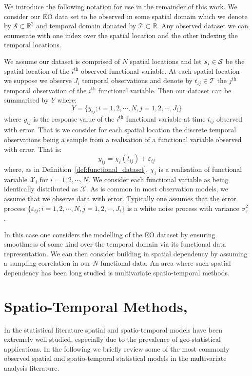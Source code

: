 We introduce the following notation for use in the remainder of this work.
We consider our EO data set to be observed in some spatial domain which we denote by $\mathcal{S} \subset \mathbb{R}^2$ and temporal domain donated by $\mathcal{T} \subset \mathbb{R}$.
Any observed dataset we can enumerate with one index over the spatial location and the other indexing the temporal locations.

We assume our dataset is comprised of $N$ spatial locations and let $\bm{{s}}_i \in \mathcal{S}$ be the spatial location of the $i^\text{th}$ observed functional variable.
At each spatial location we suppose we observe $J_i$ temporal observations and denote by $t_{ij} \in \mathcal{T}$ the $j^\text{th}$ temporal observation of the $i^\text{th}$ functional variable.
Then our dataset can be summarised by $Y$ where:
\begin{equation}
	Y = \{ y_{ij}; i=1,2,\cdots,N, j=1,2, \cdots, J_i \}
	\label{eqn:observed_data}
\end{equation}
where $y_{ij}$ is the response value of the $i^\text{th}$ functional variable at time $t_{ij}$ observed with error.
That is we consider for each spatial location the discrete temporal observations being a sample from a realisation of a functional variable observed with error.
That is:
\begin{equation}
	y_{ij} = \chi_{i}\left( t_{ij} \right) + \varepsilon_{ij}
	\label{eqn:fd_temporal}
\end{equation}
where, as in Definition~\ref{def:functional_dataset}, $\chi_i$ is a realisation of functional variable $\mathcal{X}_i$ for $i=1,2,\cdots,N$.
We consider each functional variable as being identically distributed as $\mathcal{X}$.
As is common in most observation models, we assume that we observe data with error.
Typically one assumes that the error process $\{\varepsilon_{ij}; i=1,2,\cdots,N, j=1,2,\cdots,J_i\}$ is a white noise process with variance $\sigma_\varepsilon^2$. 

In this case one considers the modelling of the EO dataset by ensuring smoothness of some kind over the temporal domain via its functional data representation.
We can then consider building in spatial dependency by assuming a sampling correlation in our $N$ functional data.
An area where such spatial dependency has been long studied is multivariate spatio-temporal methods.

\section{Spatio-Temporal Methods, \label{sec:st_methods}}
In the statistical literature spatial and spatio-temporal models have been extremely well studied, especially due to the prevalence of geo-statistical applications.
In the following we briefly review some of the most commonly observed spatial and spatio-temporal statistical models in the multivariate analysis literature. 

